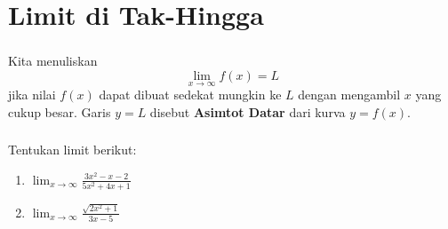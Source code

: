 \documentclass{../../kalkulus-ppt}
\begin{document}
\section{Limit di Tak-Hingga}
\begin{frame}
    \frametitle{\insertsection}
    \begin{definisi}
        Kita menuliskan \[\lim_{x\to \infty} f(x) = L\]
        jika nilai $f(x)$ dapat dibuat sedekat mungkin ke $L$ dengan mengambil $x$ yang cukup besar. Garis $y=L$ disebut \textbf{Asimtot Datar} dari kurva $y=f(x)$.
    \end{definisi}
\end{frame}

\begin{frame}
    \frametitle{\insertsection}
    \begin{contoh}
        Tentukan limit berikut:
        \begin{enumerate}
            \item $\displaystyle\lim_{x\to \infty} \frac{3x^2-x-2}{5x^2+4x+1}$
            \item $\displaystyle\lim_{x\to \infty} \frac{\sqrt{2x^2+1}}{3x-5}$
        \end{enumerate}
    \end{contoh}
\end{frame}
\end{document}
